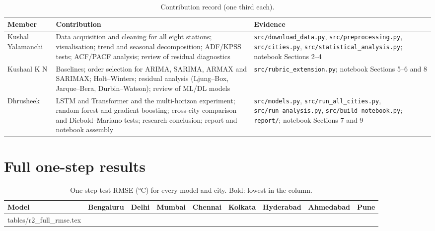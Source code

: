\documentclass[11pt,a4paper]{article}
\makeatletter
\newcommand{\tabfile}[1]{\@@input #1 }
\makeatother
\begin{document}
\begin{table}[ht]
\centering
\small
\caption{Contribution record (one third each).}
\label{tab:contrib}
\begin{tabularx}{\linewidth}{@{}l L L@{}}
\toprule
Member & Contribution & Evidence \\
\midrule
Kushal Yalamanchi & Data acquisition and cleaning for all eight stations; visualisation; trend and seasonal decomposition; ADF/KPSS tests; ACF/PACF analysis; review of residual diagnostics & \nolinkurl{src/download_data.py}, \nolinkurl{src/preprocessing.py}, \nolinkurl{src/cities.py}, \nolinkurl{src/statistical_analysis.py}; notebook Sections 2--4 \\
\addlinespace
Kushaal K N & Baselines; order selection for ARIMA, SARIMA, ARMAX and SARIMAX; Holt--Winters; residual analysis (Ljung--Box, Jarque--Bera, Durbin--Watson); review of ML/DL models & \nolinkurl{src/rubric_extension.py}; notebook Sections 5--6 and 8 \\
\addlinespace
Dhrusheek & LSTM and Transformer and the multi-horizon experiment; random forest and gradient boosting; cross-city comparison and Diebold--Mariano tests; research conclusion; report and notebook assembly & \nolinkurl{src/models.py}, \nolinkurl{src/run_all_cities.py}, \nolinkurl{src/run_analysis.py}, \nolinkurl{src/build_notebook.py}; \nolinkurl{report/}; notebook Sections 7 and 9 \\
\bottomrule
\end{tabularx}
\end{table}




\clearpage
\appendix

\section{Full one-step results}
\label{app:full}

\begin{table}[ht]
\centering
\footnotesize
\setlength{\tabcolsep}{4pt}
\caption{One-step test RMSE (\si{\degreeCelsius}) for every model and city. Bold: lowest in the column.}
\label{tab:full_rmse}
\begin{tabular}{@{}l rrrrrrrr@{}}
\toprule
Model & Bengaluru & Delhi & Mumbai & Chennai & Kolkata & Hyderabad & Ahmedabad & Pune \\
\midrule
\tabfile{tables/r2_full_rmse.tex}
\bottomrule
\end{tabular}
\end{table}
\end{document}
